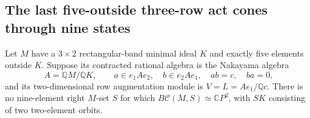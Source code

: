 \subsection{The last five-outside three-row act cones through nine states}

\begin{lemma}
\label{C:Nakayama-eleven-nine-state}
Let $M$ have a $3\times2$ rectangular-band minimal ideal $K$ and
exactly five elements outside $K$.  Suppose its contracted rational
algebra is the Nakayama algebra
\[
 A=\mathbb QM/\mathbb QK,\qquad
 a\in e_1Ae_2,\quad b\in e_2Ae_1,\quad ab=c,\quad ba=0,
\]
and its two-dimensional row augmentation module is
$V=L=Ae_1/\mathbb Qc$.
There is no nine-element right $M$-set $S$ for which
$B\mathcal C(M,S)\simeq\mathbb CP^2$, with $SK$ consisting of
two two-element orbits.
\end{lemma}
